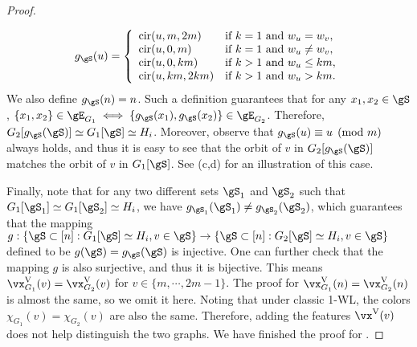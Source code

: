 \documentclass{article} %
\let\cref\crtcref
\begin{document}
\begin{proof}
\begin{itemize}[topsep=0pt,leftmargin=30pt]
\begin{equation*}
        g_\gS(u)=\left\{\begin{array}{ll}
            \operatorname{cir}(u,m,2m) & \text{if }k=1\text{ and }w_u=w_v, \\
            \operatorname{cir}(u,0,m) & \text{if }k=1\text{ and }w_u\neq w_v, \\
            \operatorname{cir}(u,0,km) & \text{if }k>1\text{ and }w_u\le km,\\
            \operatorname{cir}(u,km,2km) & \text{if }k>1\text{ and }w_u> km.
        \end{array}\right.
    \end{equation*}
    We also define $g_\gS(n)=n$. Such a definition guarantees that for any $x_1,x_2\in\gS$, $\{x_1,x_2\}\in\gE_{G_1}\iff \{g_\gS(x_1),g_\gS(x_2)\}\in\gE_{G_2}$. Therefore, $G_2[g_\gS(\gS)]\simeq G_1[\gS]\simeq H_i$. Moreover, observe that $g_\gS(u)\equiv u\pmod{m}$ always holds, and thus it is easy to see that the orbit of $v$ in $G_2[g_\gS(\gS)]$ matches the orbit of $v$ in $G_1[\gS]$. See \cref{fig:proof_scwl}(c,d) for an illustration of this case.
\end{itemize}
Finally, note that for any two different sets $\gS_1$ and $\gS_2$ such that $G_1[\gS_1]\simeq G_1[\gS_2]\simeq H_i$, we have $g_{\gS_1}(\gS_1)\neq g_{\gS_2}(\gS_2)$, which guarantees that the mapping $g:\{\gS\subset[n]:G_1[\gS]\simeq H_i,v\in\gS\}\to\{\gS\subset[n]:G_2[\gS]\simeq H_i,v\in\gS\}$ defined to be $g(\gS)=g_\gS(\gS)$ is injective. One can further check that the mapping $g$ is also surjective, and thus it is bijective. This means $\vx_{G_1}^\mathrm{V}(v)=\vx_{G_2}^\mathrm{V}(v)$ for $v\in\{m,\cdots,2m-1\}$. The proof for $\vx_{G_1}^\mathrm{V}(n)=\vx_{G_2}^\mathrm{V}(n)$ is almost the same, so we omit it here. Noting that under classic 1-WL, the colors $\chi_{G_1}(v)=\chi_{G_2}(v)$ are also the same. Therefore, adding the features $\vx^\mathrm{V}(v)$ does not help distinguish the two graphs. We have finished the proof for \cref{example:1}.
\end{proof}
\end{document}
